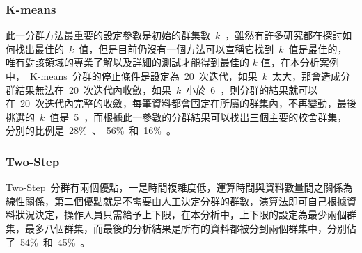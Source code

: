 \subsubsection{K-means}

此一分群方法最重要的設定參數是初始的群集數~$k$~，雖然有許多研究都在探討如何找出最佳的~$k$~值，但是目前仍沒有一個方法可以宣稱它找到~$k$~值是最佳的，唯有對該領域的專業了解以及詳細的測試才能得到最佳的 $k$ 值，在本分析案例中，~K-means~分群的停止條件是設定為~20~次迭代，如果~$k$~太大，那會造成分群結果無法在~20~次迭代內收斂，如果~$k$~小於~6~，則分群的結果就可以在~20~次迭代內完整的收斂，每筆資料都會固定在所屬的群集內，不再變動，最後挑選的~$k$~值是~5~，而根據此一參數的分群結果可以找出三個主要的校舍群集，分別的比例是~28\%~、~56\%~和~16\%~。


\subsubsection{Two-Step}

Two-Step~分群有兩個優點，一是時間複雜度低，運算時間與資料數量間之關係為線性關係，第二個優點就是不需要由人工決定分群的群數，演算法即可自己根據資料狀況決定，操作人員只需給予上下限，在本分析中，上下限的設定為最少兩個群集，最多八個群集，而最後的分析結果是所有的資料都被分到兩個群集中，分別佔了~54\%~和~45\%~。


